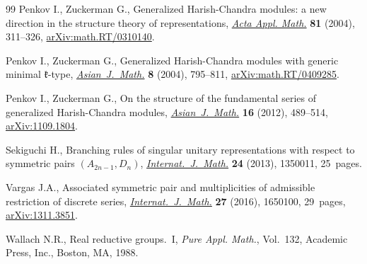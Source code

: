 \begin{thebibliography}{99}
Penkov I., Zuckerman G., Generalized {H}arish-{C}handra modules: a new
 direction in the structure theory of representations,
 \href{https://doi.org/10.1023/B:ACAP.0000024204.22996.2c}{\textit{Acta Appl.
 Math.}} \textbf{81} (2004), 311--326,
 \href{http://arxiv.org/abs/math.RT/0310140}{arXiv:math.RT/0310140}.

Penkov I., Zuckerman G., Generalized {H}arish-{C}handra modules with generic
 minimal {$\mathfrak{k}$}-type,
 \href{https://doi.org/10.4310/ajm.2004.v8.n4.a25}{\textit{Asian~J.~Math.}}
 \textbf{8} (2004), 795--811,
 \href{http://arxiv.org/abs/math.RT/0409285}{arXiv:math.RT/0409285}.

Penkov I., Zuckerman G., On the structure of the fundamental series of
 generalized {H}arish-{C}handra modules,
 \href{https://doi.org/10.4310/AJM.2012.v16.n3.a8}{\textit{Asian~J.~Math.}}
 \textbf{16} (2012), 489--514,
 \href{http://arxiv.org/abs/1109.1804}{arXiv:1109.1804}.

Sekiguchi H., Branching rules of singular unitary representations with respect
 to symmetric pairs {$(A_{2n-1},D_n)$},
 \href{https://doi.org/10.1142/S0129167X13500110}{\textit{Internat.~J.~Math.}}
 \textbf{24} (2013), 1350011, 25~pages.

Vargas J.A., Associated symmetric pair and multiplicities of admissible
 restriction of discrete series,
 \href{https://doi.org/10.1142/S0129167X16501007}{\textit{Internat.~J.~Math.}}
 \textbf{27} (2016), 1650100, 29~pages,
 \href{http://arxiv.org/abs/1311.3851}{arXiv:1311.3851}.

Wallach N.R., Real reductive groups.~{I}, \textit{Pure Appl. Math.}, Vol.~132,
 Academic Press, Inc., Boston, MA, 1988.

\end{thebibliography}
